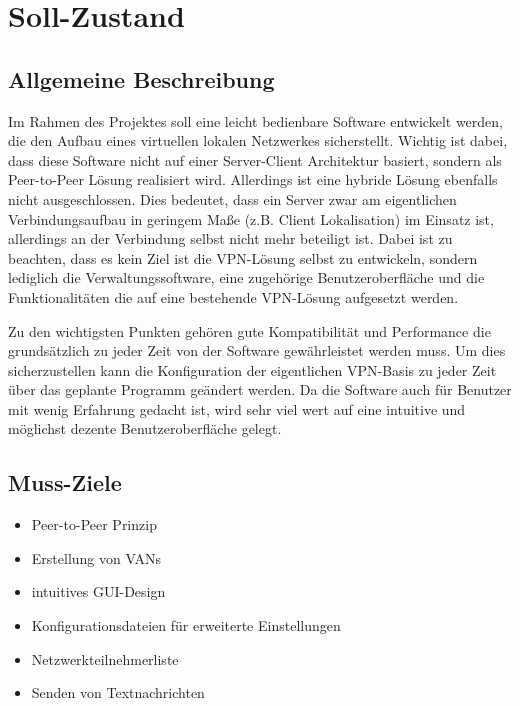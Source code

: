 \documentclass[a4paper,12pt]{scrreprt}
\begin{document}
		
	\section{Soll-Zustand}
		
		\subsection{Allgemeine Beschreibung}
		
		Im Rahmen des Projektes soll eine leicht bedienbare Software entwickelt werden, die den Aufbau eines virtuellen lokalen Netzwerkes sicherstellt. Wichtig ist dabei, dass diese Software nicht auf einer Server-Client Architektur basiert, sondern als Peer-to-Peer Lösung realisiert wird. Allerdings ist eine hybride Lösung ebenfalls nicht ausgeschlossen. Dies bedeutet, dass ein Server zwar am eigentlichen Verbindungsaufbau in geringem Maße (z.B. Client Lokalisation) im Einsatz ist, allerdings an der Verbindung selbst nicht mehr beteiligt ist. Dabei ist zu beachten, dass es kein Ziel ist die VPN-Lösung selbst zu entwickeln, sondern lediglich die Verwaltungssoftware, eine zugehörige Benutzeroberfläche und die Funktionalitäten die auf eine bestehende VPN-Lösung aufgesetzt werden.
		
		Zu den wichtigsten Punkten gehören gute Kompatibilität und Performance die grundsätzlich zu jeder Zeit von der Software gewährleistet werden muss. Um dies sicherzustellen kann die Konfiguration der eigentlichen VPN-Basis zu jeder Zeit über das geplante Programm geändert werden. Da die Software auch für Benutzer mit wenig Erfahrung gedacht ist, wird sehr viel wert auf eine intuitive und möglichst dezente Benutzeroberfläche gelegt.
		
			
		\subsection{Muss-Ziele}
		\begin{itemize}
		\item Peer-to-Peer Prinzip
		\item Erstellung von VANs
		\item intuitives GUI-Design
		\item Konfigurationsdateien für erweiterte Einstellungen
		\item Netzwerkteilnehmerliste
		\item Senden von Textnachrichten
		\end{itemize}
		
			
\end{document}
